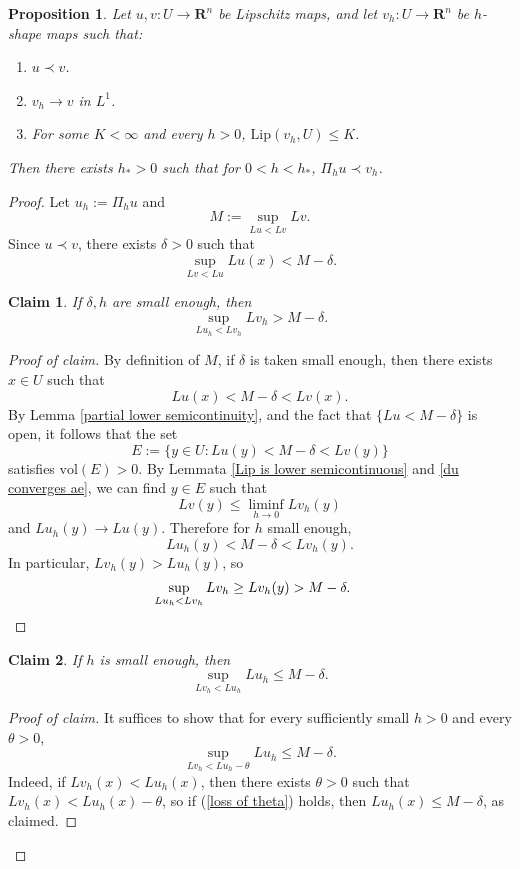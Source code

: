 \documentclass[reqno,11pt]{amsart}
\newcommand{\RR}{\mathbf{R}}
\newcommand{\vol}{\mathrm{vol}}
\newcommand{\Lip}{\mathrm{Lip}}
\newtheorem{proposition}[theorem]{Proposition}
\newtheorem{claim}{Claim}[theorem]
\theoremstyle{definition}
\numberwithin{equation}{section}
\begin{document}
\begin{proposition}\label{discrete tight maps converge}
Let $u, v: U \to \RR^n$ be Lipschitz maps, and let $v_h: U \to \RR^n$ be $h$-shape maps such that:
\begin{enumerate}
\item $u \prec v$.
\item $v_h \to v$ in $L^1$.
\item For some $K < \infty$ and every $h > 0$, $\Lip(v_h, U) \leq K$.
\end{enumerate}
Then there exists $h_* > 0$ such that for $0 < h < h_*$, $\Pi_h u \prec v_h$.
\end{proposition}
\begin{proof}
Let $u_h := \Pi_h u$ and
$$M := \sup_{Lu < Lv} Lv.$$
Since $u \prec v$, there exists $\delta > 0$ such that
$$\sup_{Lv < Lu} Lu(x) < M - \delta.$$

\begin{claim}
If $\delta, h$ are small enough, then 
$$\sup_{Lu_h < Lv_h} Lv_h > M - \delta.$$
\end{claim}
\begin{proof}[Proof of claim]
By definition of $M$, if $\delta$ is taken small enough, then there exists $x \in U$ such that
$$Lu(x) < M - \delta < Lv(x).$$
By Lemma \ref{partial lower semicontinuity}, and the fact that $\{Lu < M - \delta\}$ is open, it follows that the set
$$E := \{y \in U: Lu(y) < M - \delta < Lv(y)\}$$
satisfies $\vol(E) > 0$.
By Lemmata \ref{Lip is lower semicontinuous} and \ref{du converges ae}, we can find $y \in E$ such that
$$Lv(y) \leq \liminf_{h \to 0} Lv_h(y)$$
and $Lu_h(y) \to Lu(y)$.
Therefore for $h$ small enough,
$$Lu_h(y) < M - \delta < Lv_h(y).$$
In particular, $Lv_h(y) > Lu_h(y)$, so 
\begin{align*}
\sup_{Lu_h < Lv_h} Lv_h \geq Lv_h(y) &> M - \delta. \qedhere 
\end{align*}
\end{proof}

\begin{claim}
If $h$ is small enough, then 
$$\sup_{Lv_h < Lu_h} Lu_h \leq M - \delta.$$
\end{claim}
\begin{proof}[Proof of claim]
It suffices to show that for every sufficiently small $h > 0$ and every $\theta > 0$,
\begin{equation}\label{loss of theta}
\sup_{Lv_h < Lu_h - \theta} Lu_h \leq M - \delta.
\end{equation}
Indeed, if $Lv_h(x) < Lu_h(x)$, then there exists $\theta > 0$ such that $Lv_h(x) < Lu_h(x) - \theta$, so if (\ref{loss of theta}) holds, then $Lu_h(x) \leq M - \delta$, as claimed.


\end{proof}
\end{proof}
\end{document}

